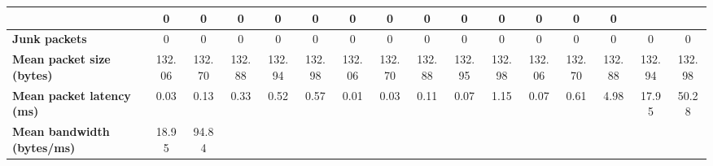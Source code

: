 \begin{table}[!h]
{\begin{tabular}{|l|ccccc|ccccc|ccccc|}
            & \multicolumn{1}{c|}{0}
            & \multicolumn{1}{c|}{0}
            & \multicolumn{1}{c|}{0}
            & \multicolumn{1}{c|}{0}
            & \multicolumn{1}{c|}{0}
            & \multicolumn{1}{c|}{0}
            & \multicolumn{1}{c|}{0}
            & \multicolumn{1}{c|}{0}
            & \multicolumn{1}{c|}{0}
            & \multicolumn{1}{c|}{0}
            & \multicolumn{1}{c|}{0}
            & \multicolumn{1}{c|}{0}
            & \multicolumn{1}{c|}{0}
            \\ \hline
            \textbf{Junk packets} & \multicolumn{1}{c|}{0} & \multicolumn{1}{c|}{0}
            & \multicolumn{1}{c|}{0}
            & \multicolumn{1}{c|}{0}
            & \multicolumn{1}{c|}{0}
            & \multicolumn{1}{c|}{0}
            & \multicolumn{1}{c|}{0}
            & \multicolumn{1}{c|}{0}
            & \multicolumn{1}{c|}{0}
            & \multicolumn{1}{c|}{0}
            & \multicolumn{1}{c|}{0}
            & \multicolumn{1}{c|}{0}
            & \multicolumn{1}{c|}{0}
            & \multicolumn{1}{c|}{0}
            & \multicolumn{1}{c|}{0}
            \\ \hline
            \textbf{Mean packet size (bytes)} & \multicolumn{1}{c|}{132.06} & \multicolumn{1}{c|}{132.70}
            & \multicolumn{1}{c|}{132.88}
            & \multicolumn{1}{c|}{132.94}
            & \multicolumn{1}{c|}{132.98}
            & \multicolumn{1}{c|}{132.06}
            & \multicolumn{1}{c|}{132.70}
            & \multicolumn{1}{c|}{132.88}
            & \multicolumn{1}{c|}{132.95}
            & \multicolumn{1}{c|}{132.98}
            & \multicolumn{1}{c|}{132.06}
            & \multicolumn{1}{c|}{132.70}
            & \multicolumn{1}{c|}{132.88}
            & \multicolumn{1}{c|}{132.94}
            & \multicolumn{1}{c|}{132.98}
            \\ \hline
            \textbf{Mean packet latency (ms)} & \multicolumn{1}{c|}{0.03} & \multicolumn{1}{c|}{0.13}
            & \multicolumn{1}{c|}{0.33}
            & \multicolumn{1}{c|}{0.52}
            & \multicolumn{1}{c|}{0.57}
            & \multicolumn{1}{c|}{0.01}
            & \multicolumn{1}{c|}{0.03}
            & \multicolumn{1}{c|}{0.11}
            & \multicolumn{1}{c|}{0.07}
            & \multicolumn{1}{c|}{1.15}
            & \multicolumn{1}{c|}{0.07}
            & \multicolumn{1}{c|}{0.61}
            & \multicolumn{1}{c|}{4.98}
            & \multicolumn{1}{c|}{17.95}
            & \multicolumn{1}{c|}{50.28}
            \\ \hline
            \textbf{Mean bandwidth (bytes/ms)} & \multicolumn{1}{c|}{18.95} & \multicolumn{1}{c|}{94.84}

\end{tabular}}
\end{table}
